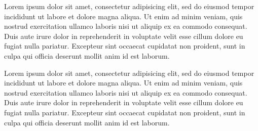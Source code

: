 Lorem ipsum dolor sit amet, consectetur adipisicing elit, sed do eiusmod tempor incididunt ut labore et dolore magna aliqua. Ut enim ad minim veniam, quis nostrud exercitation ullamco laboris nisi ut aliquip ex ea commodo consequat. Duis aute irure dolor in reprehenderit in voluptate velit esse cillum dolore eu fugiat nulla pariatur. Excepteur sint occaecat cupidatat non proident, sunt in culpa qui officia deserunt mollit anim id est laborum.

Lorem ipsum dolor sit amet, consectetur adipisicing elit, sed do eiusmod tempor incididunt ut labore et dolore magna aliqua. Ut enim ad minim veniam, quis nostrud exercitation ullamco laboris nisi ut aliquip ex ea commodo consequat. Duis aute irure dolor in reprehenderit in voluptate velit esse cillum dolore eu fugiat nulla pariatur. Excepteur sint occaecat cupidatat non proident, sunt in culpa qui officia deserunt mollit anim id est laborum.
